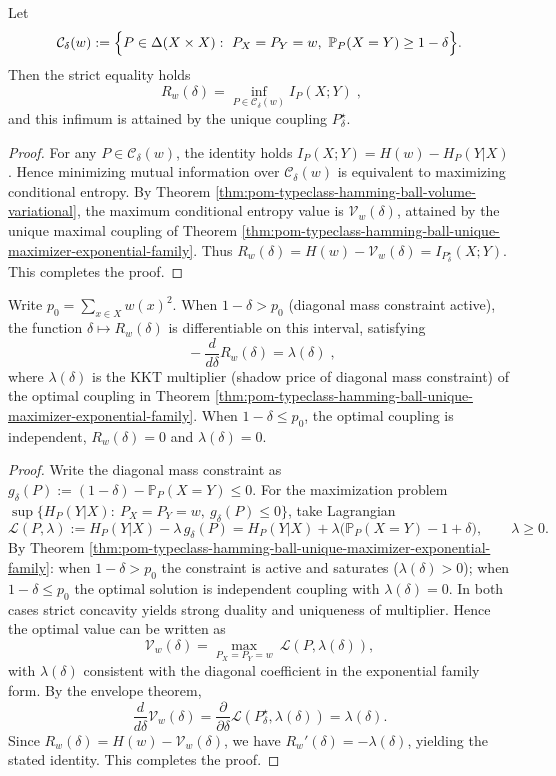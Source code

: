 \begin{theorem}\label{thm:pom-typeclass-rate-distortion-mutual-information}
Let
\[
\mathcal C_\delta(w):=\Bigl\{P\in\Delta(X\times X):\ P_X=P_Y=w,\ \mathbb P_P(X=Y)\ge 1-\delta\Bigr\}.
\]
Then the strict equality holds
\[
\boxed{\;
R_w(\delta)=\inf_{P\in\mathcal C_\delta(w)} I_P(X;Y)\; } ,
\]
and this infimum is attained by the unique coupling \(P^\star_\delta\).
\end{theorem}
\begin{proof}
For any \(P\in\mathcal C_\delta(w)\), the identity holds
\(
I_P(X;Y)=H(w)-H_P(Y|X)
\).
Hence minimizing mutual information over \(\mathcal C_\delta(w)\) is equivalent to maximizing conditional entropy.
By Theorem \ref{thm:pom-typeclass-hamming-ball-volume-variational},
the maximum conditional entropy value is \(\mathcal V_w(\delta)\), attained by the unique maximal coupling of Theorem \ref{thm:pom-typeclass-hamming-ball-unique-maximizer-exponential-family}.
Thus
\(
R_w(\delta)=H(w)-\mathcal V_w(\delta)=I_{P^\star_\delta}(X;Y)
\).
This completes the proof.
\end{proof}
\begin{theorem}\label{thm:pom-typeclass-dual-derivative}
Write \(p_0=\sum_{x\in X}w(x)^2\).
When \(1-\delta>p_0\) (diagonal mass constraint active), the function \(\delta\mapsto R_w(\delta)\) is differentiable on this interval, satisfying
\[
\boxed{\;
-\frac{d}{d\delta}R_w(\delta)=\lambda(\delta)\; } ,
\]
where \(\lambda(\delta)\) is the KKT multiplier (shadow price of diagonal mass constraint) of the optimal coupling in Theorem \ref{thm:pom-typeclass-hamming-ball-unique-maximizer-exponential-family}.
When \(1-\delta\le p_0\), the optimal coupling is independent, \(R_w(\delta)=0\) and \(\lambda(\delta)=0\).
\end{theorem}
\begin{proof}
Write the diagonal mass constraint as
\(
g_\delta(P):=(1-\delta)-\mathbb P_P(X=Y)\le 0
\).
For the maximization problem
\(
\sup\{H_P(Y|X):\ P_X=P_Y=w,\ g_\delta(P)\le 0\}
\),
take Lagrangian
\[
\mathscr L(P,\lambda)
:=H_P(Y|X)-\lambda\,g_\delta(P)
=H_P(Y|X)+\lambda\bigl(\mathbb P_P(X=Y)-1+\delta\bigr),
\qquad \lambda\ge 0.
\]
By Theorem \ref{thm:pom-typeclass-hamming-ball-unique-maximizer-exponential-family}:
when \(1-\delta>p_0\) the constraint is active and saturates (\(\lambda(\delta)>0\));
when \(1-\delta\le p_0\) the optimal solution is independent coupling with \(\lambda(\delta)=0\).
In both cases strict concavity yields strong duality and uniqueness of multiplier.
Hence the optimal value can be written as
\[
\mathcal V_w(\delta)=\max_{P_X=P_Y=w}\ \mathscr L(P,\lambda(\delta)),
\]
with \(\lambda(\delta)\) consistent with the diagonal coefficient in the exponential family form.
By the envelope theorem,
\[
\frac{d}{d\delta}\mathcal V_w(\delta)=\frac{\partial}{\partial\delta}\mathscr L(P^\star_\delta,\lambda(\delta))=\lambda(\delta).
\]
Since \(R_w(\delta)=H(w)-\mathcal V_w(\delta)\), we have \(R_w'(\delta)=-\lambda(\delta)\), yielding the stated identity. This completes the proof.
\end{proof}
\endinput





